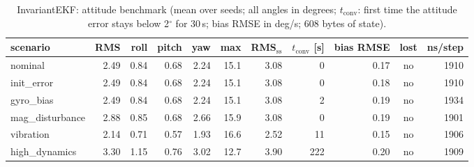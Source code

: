 \begin{table}[H]\centering\footnotesize\setlength{\tabcolsep}{3.5pt}\caption{InvariantEKF: attitude benchmark (mean over seeds; all angles in degrees; $t_\mathrm{conv}$: first time the attitude error stays below 2$^\circ$ for 30\,s; bias RMSE in deg/s; 608 bytes of state).}\label{tab:imu_InvariantEKF}
\begin{tabular}{lrrrrrrrrcr}\toprule scenario & RMS & roll & pitch & yaw & max & RMS$_\mathrm{ss}$ & $t_\mathrm{conv}$ [s] & bias RMSE & lost & ns/step \\ \midrule
nominal & 2.49 & 0.84 & 0.68 & 2.24 & 15.1 & 3.08 & 0 & 0.17 & no & 1910 \\
init\_error & 2.49 & 0.84 & 0.68 & 2.24 & 15.1 & 3.08 & 0 & 0.18 & no & 1910 \\
gyro\_bias & 2.49 & 0.84 & 0.68 & 2.24 & 15.1 & 3.08 & 2 & 0.19 & no & 1934 \\
mag\_disturbance & 2.88 & 0.85 & 0.68 & 2.66 & 15.9 & 3.08 & 0 & 0.19 & no & 1901 \\
vibration & 2.14 & 0.71 & 0.57 & 1.93 & 16.6 & 2.52 & 11 & 0.15 & no & 1906 \\
high\_dynamics & 3.30 & 1.15 & 0.76 & 3.02 & 12.7 & 3.90 & 222 & 0.20 & no & 1909 \\
\bottomrule\end{tabular}\end{table}
